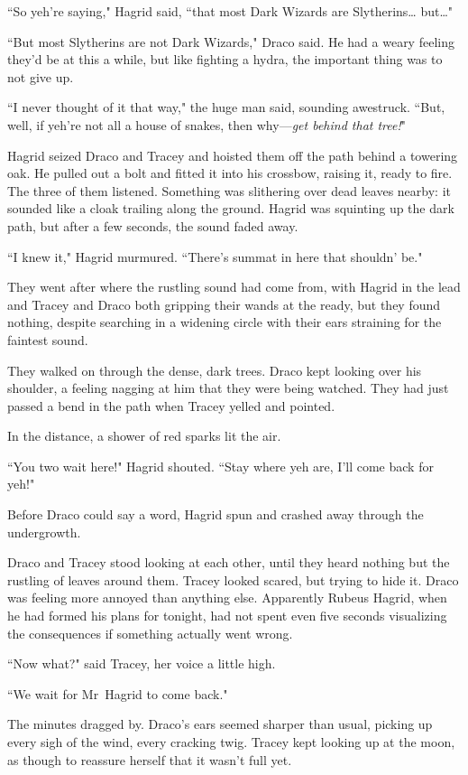 ``So yeh're saying," Hagrid said, ``that most Dark Wizards are Slytherins{\ldots} but{\ldots}"

``But most Slytherins are not Dark Wizards," Draco said. He had a weary feeling they'd be at this a while, but like fighting a hydra, the important thing was to not give up.

``I never thought of it that way," the huge man said, sounding awestruck. ``But, well, if yeh're not all a house of snakes, then why—\emph{get behind that tree!}"

Hagrid seized Draco and Tracey and hoisted them off the path behind a towering oak. He pulled out a bolt and fitted it into his crossbow, raising it, ready to fire. The three of them listened. Something was slithering over dead leaves nearby: it sounded like a cloak trailing along the ground. Hagrid was squinting up the dark path, but after a few seconds, the sound faded away.

``I knew it," Hagrid murmured. ``There's summat in here that shouldn' be."

They went after where the rustling sound had come from, with Hagrid in the lead and Tracey and Draco both gripping their wands at the ready, but they found nothing, despite searching in a widening circle with their ears straining for the faintest sound.

They walked on through the dense, dark trees. Draco kept looking over his shoulder, a feeling nagging at him that they were being watched. They had just passed a bend in the path when Tracey yelled and pointed.

In the distance, a shower of red sparks lit the air.

``You two wait here!" Hagrid shouted. ``Stay where yeh are, I'll come back for yeh!"

Before Draco could say a word, Hagrid spun and crashed away through the undergrowth.

Draco and Tracey stood looking at each other, until they heard nothing but the rustling of leaves around them. Tracey looked scared, but trying to hide it. Draco was feeling more annoyed than anything else. Apparently Rubeus Hagrid, when he had formed his plans for tonight, had not spent even five seconds visualizing the consequences if something actually went wrong.

``Now what?" said Tracey, her voice a little high.

``We wait for Mr~Hagrid to come back."

The minutes dragged by. Draco's ears seemed sharper than usual, picking up every sigh of the wind, every cracking twig. Tracey kept looking up at the moon, as though to reassure herself that it wasn't full yet.

